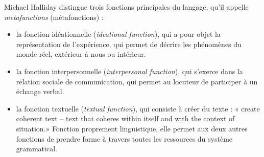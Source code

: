 Michael Halliday distingue trois fonctions principales du langage, qu’il appelle \textit{metafunctions} (métafonctions) :
\begin{itemize}
\item la fonction idéationnelle (\textit{ideational function}), qui a pour objet la représentation de l’expérience, qui permet de décrire les phénomènes du monde réel, extérieur à nous ou intérieur.
\item la fonction interpersonnelle (\textit{interpersonal function}), qui s’exerce dans la relation sociale de communication, qui permet au locuteur de participer à un échange verbal.
\item la fonction textuelle (\textit{textual function}), qui consiste à créer du texte : « create coherent text – text that coheres within itself and with the context of situation.» Fonction proprement linguistique, elle permet aux deux autres fonctions de prendre forme à travers toutes les ressources du système grammatical.
\end{itemize}

